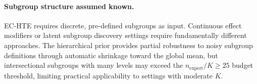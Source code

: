 \paragraph{Subgroup structure assumed known.}
EC-HTE requires discrete, pre-defined subgroups as input.
Continuous effect modifiers or latent subgroup discovery settings require fundamentally different approaches.
The hierarchical prior provides partial robustness to noisy subgroup definitions through automatic shrinkage toward the global mean, but intersectional subgroups with many levels may exceed the $n_{\text{expert}} / K \geq 25$ budget threshold, limiting practical applicability to settings with moderate $K$.
